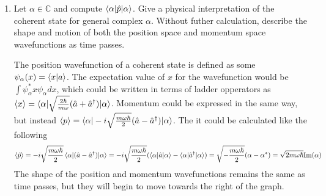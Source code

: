 \documentclass[10pt,letterpaper]{article}
\begin{document}
\begin{enumerate}
\begin{enumerate}
\color{violet}
In terms of $\hat{x}$ and $\hat{p}$, $\hat{a}$ and $\hat{a}^{\dagger}$ are expressed like the following
$$\hat{a} = \sqrt{\frac{m\omega}{2\hbar}}\left( \hat{x} + \frac{i}{m\omega}\hat{p} \right),\ \ \hat{a}^{\dagger} = \sqrt{\frac{m\omega}{2\hbar}}\left( \hat{x} - \frac{i}{m\omega}\hat{p} \right)$$
These values of $\hat{a}$ and $\hat{a}^{\dagger}$ can be plugged into $\ket{\alpha}$ to get the following
\begin{gather*}
\ket{\alpha} = e^{-\frac{1}{2}|\alpha|^{2}}e^{\alpha\hat{a}^{\dagger}}\ket{0} = e^{-\frac{1}{2}|\alpha|^{2}}e^{\alpha \sqrt{\frac{m\omega}{2\hbar}}\left( \hat{x} - \frac{i}{m\omega}\hat{p} \right)}\ket{0} = e^{-\frac{1}{2}|\alpha|^{2}}e^{\alpha\frac{m\omega}{2\hbar}\hat{x} - \alpha\frac{m\omega}{2\hbar}\frac{i}{m\omega}\hat{p}}\ket{0}
\end{gather*}
\color{black}

\item Let $\alpha \in \mathbb{C}$ and compute $\braket{\alpha | \hat{p} | \alpha}$. Give a physical interpretation of the coherent state for general complex $\alpha$. Without futher calculation, describe the shape and motion of both the position space and momentum space wavefunctions as time passes. 

\color{violet}
The position wavefunction of a coherent state is defined as some $\psi_{\alpha}(x) = \braket{x | a}$. The expectation value of $x$ for the wavefunction would be $\int \psi_{\alpha}^{*} x \psi_{\alpha}dx$, which could be written in terms of ladder opperators as $\braket{x} = \braket{\alpha | \sqrt{\frac{2\hbar}{m\omega}}(\hat{a} + \hat{a}^{\dagger}) | \alpha}$. Momentum could be expressed in the same way, but instead $\braket{p} = \braket{\alpha | -i\sqrt{\frac{m\omega\hbar}{2}} (\hat{a} - \hat{a}^{\dagger})| \alpha}$. The it could be calculated like the following
$$\braket{\hat{p}} = -i\sqrt{\frac{m\omega\hbar}{2}}\braket{\alpha | (\hat{a} - \hat{a}^{\dagger}) | \alpha} = -i\sqrt{\frac{m\omega\hbar}{2}} (\braket{\alpha | \hat{a} | \alpha} - \braket{\alpha | \hat{a}^{\dagger} | \alpha}) = \sqrt{-\frac{m\omega\hbar}{2}} (\alpha - \alpha^{*}) = \sqrt{2m\omega\hbar}\text{Im}(\alpha)$$
The shape of the position and momentum wavefunctions remains the same as time passes, but they will begin to move towards the right of the graph. 
\color{black}

\end{enumerate}

\end{enumerate}
\end{document}
